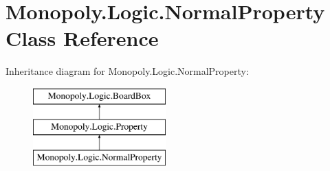\hypertarget{class_monopoly_1_1_logic_1_1_normal_property}{}\section{Monopoly.\+Logic.\+Normal\+Property Class Reference}
\label{class_monopoly_1_1_logic_1_1_normal_property}
Inheritance diagram for Monopoly.\+Logic.\+Normal\+Property\+:\begin{figure}[H]
\begin{center}
\leavevmode
\includegraphics[height=3.000000cm]{class_monopoly_1_1_logic_1_1_normal_property}
\end{center}
\end{figure}
